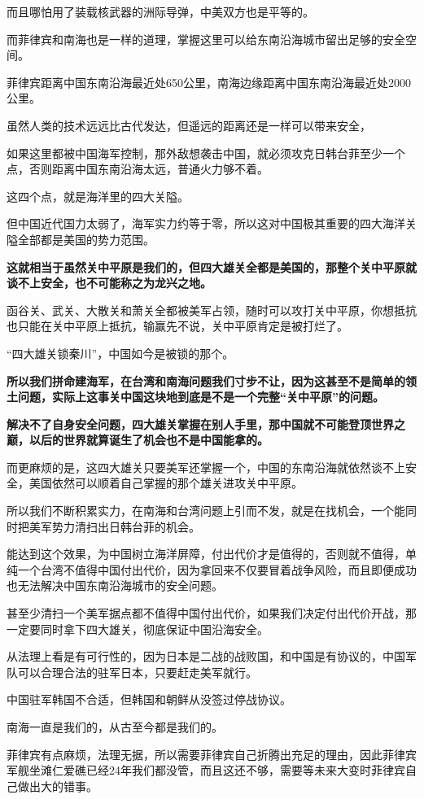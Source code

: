 \documentclass[UTF8, 11pt, oneside]{ctexart}
\newcommand{\zd}[1]{\textbf{\textcolor[RGB]{123,12,0}{#1}}} %
\begin{document}
而且哪怕用了装载核武器的洲际导弹，中美双方也是平等的。

而菲律宾和南海也是一样的道理，掌握这里可以给东南沿海城市留出足够的安全空间。

菲律宾距离中国东南沿海最近处650公里，南海边缘距离中国东南沿海最近处2000公里。

虽然人类的技术远远比古代发达，但遥远的距离还是一样可以带来安全，

如果这里都被中国海军控制，那外敌想袭击中国，就必须攻克日韩台菲至少一个点，否则距离中国东南沿海太远，普通火力够不着。

这四个点，就是海洋里的四大关隘。

但中国近代国力太弱了，海军实力约等于零，所以这对中国极其重要的四大海洋关隘全部都是美国的势力范围。

\zd{这就相当于虽然关中平原是我们的，但四大雄关全都是美国的，那整个关中平原就谈不上安全，也不可能称之为龙兴之地。}

函谷关、武关、大散关和萧关全都被美军占领，随时可以攻打关中平原，你想抵抗也只能在关中平原上抵抗，输赢先不说，关中平原肯定是被打烂了。

“四大雄关锁秦川”，中国如今是被锁的那个。

\zd{所以我们拼命建海军，在台湾和南海问题我们寸步不让，因为这甚至不是简单的领土问题，实际上这事关中国这块地到底是不是一个完整“关中平原”的问题。}

\zd{解决不了自身安全问题，四大雄关掌握在别人手里，那中国就不可能登顶世界之巅，以后的世界就算诞生了机会也不是中国能拿的。}

而更麻烦的是，这四大雄关只要美军还掌握一个，中国的东南沿海就依然谈不上安全，美国依然可以顺着自己掌握的那个雄关进攻关中平原。

所以我们不断积累实力，在南海和台湾问题上引而不发，就是在找机会，一个能同时把美军势力清扫出日韩台菲的机会。

能达到这个效果，为中国树立海洋屏障，付出代价才是值得的，否则就不值得，单纯一个台湾不值得中国付出代价，因为拿回来不仅要冒着战争风险，而且即便成功也无法解决中国东南沿海城市的安全问题。

甚至少清扫一个美军据点都不值得中国付出代价，如果我们决定付出代价开战，那一定要同时拿下四大雄关，彻底保证中国沿海安全。

从法理上看是有可行性的，因为日本是二战的战败国，和中国是有协议的，中国军队可以合理合法的驻军日本，只要赶走美军就行。

中国驻军韩国不合适，但韩国和朝鲜从没签过停战协议。

南海一直是我们的，从古至今都是我们的。

菲律宾有点麻烦，法理无据，所以需要菲律宾自己折腾出充足的理由，因此菲律宾军舰坐滩仁爱礁已经24年我们都没管，而且这还不够，需要等未来大变时菲律宾自己做出大的错事。
\end{document}
